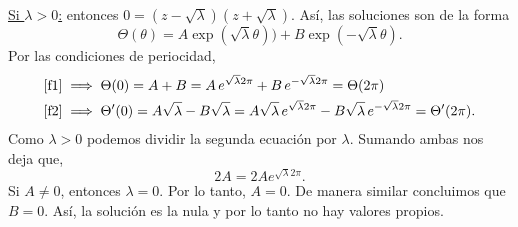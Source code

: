 \begin{Solucion}
\begin{enumerate}[label=(\alph*), topsep=3pt, itemsep=2pt]
	\underline{Si \(\lambda > 0\):} entonces \(0 = (z -
	\sqrt{\lambda})(z + \sqrt{\lambda})\). Así, las soluciones son de
	la forma
	\begin{displaymath}
		\Theta(\theta)
		= 
		A \exp(\sqrt{\lambda} \theta)) + 
		B \exp(-\sqrt{\lambda} \theta).
	\end{displaymath}
	Por las condiciones de periocidad, 
	\begin{align*}
		\eqref{f1} &\implies
		\Theta(0) = A + B 
		= 
		A\, e^{\sqrt{\lambda} 2\pi} +
		B\, e^{-\sqrt{\lambda} 2\pi}
		=
		\Theta(2\pi)
		\\
		\eqref{f2} &\implies
		\Theta'(0) = A\sqrt{\lambda} - B\sqrt{\lambda} 
		= 
		A\sqrt{\lambda}\, e^{\sqrt{\lambda} 2\pi} -
		B\sqrt{\lambda}\, e^{-\sqrt{\lambda} 2\pi}
		=
		\Theta'(2\pi).
	\end{align*}
	Como \(\lambda > 0\) podemos dividir la segunda ecuación por
	\(\lambda\). Sumando ambas nos deja que,
	\begin{displaymath}
		2A = 2A e^{\sqrt{\lambda} 2\pi}.
	\end{displaymath}
	Si \(A \ne 0\), entonces \(\lambda = 0\). Por lo tanto, \(A = 0\).
	De manera similar concluimos que \(B = 0\). Así, la solución es la
	nula y por lo tanto no hay valores propios.


\end{enumerate}
\end{Solucion}
